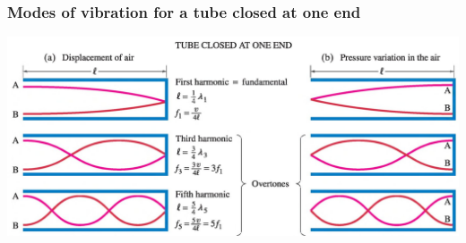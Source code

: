 \documentclass[]{beamer}
\begin{document}


 \begin{frame}
 \frametitle{Modes of vibration for a tube closed at one end}

   \begin{center}
   \includegraphics[height=2.in]{images4/tubeclose.jpg}
 \end{center}


   \end{frame}





 











\end{document}
